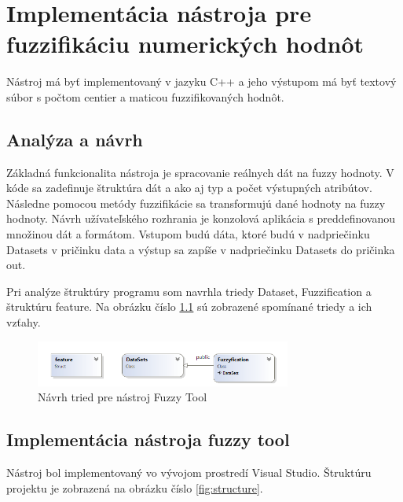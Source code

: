 \chapter{Implementácia nástroja pre fuzzifikáciu numerických hodnôt} 
Nástroj má byť implementovaný v jazyku C++ a jeho výstupom má byť textový súbor s počtom centier a maticou fuzzifikovaných hodnôt. 

\section{Analýza a návrh}

Základná funkcionalita nástroja je spracovanie reálnych dát na fuzzy hodnoty. 
V kóde sa zadefinuje štruktúra dát a ako aj typ a počet výstupných atribútov. Následne pomocou metódy fuzzifikácie sa transformujú dané hodnoty na fuzzy hodnoty.  Návrh užívateľského rozhrania je konzolová aplikácia s preddefinovanou množinou dát a formátom. Vstupom budú dáta, ktoré budú v nadpriečinku Datasets v pričinku data a výstup sa zapíše v nadpriečinku Datasets do pričinka out. 


Pri analýze štruktúry programu som navrhla triedy Dataset, Fuzzification a štruktúru feature. Na obrázku číslo \ref{fig:pohlad} sú zobrazené spomínané triedy a ich vzťahy.





\begin{figure}[h]
\includegraphics[width=0.75\textwidth]{obrazky/pohlad.PNG}
\centering
\caption{Návrh tried pre nástroj Fuzzy Tool} 
\label{fig:pohlad}
\end{figure}



\section{Implementácia nástroja fuzzy tool}

Nástroj bol implementovaný vo vývojom prostredí Visual Studio. Štruktúru projektu je  zobrazená na obrázku číslo \ref{fig:structure}.

